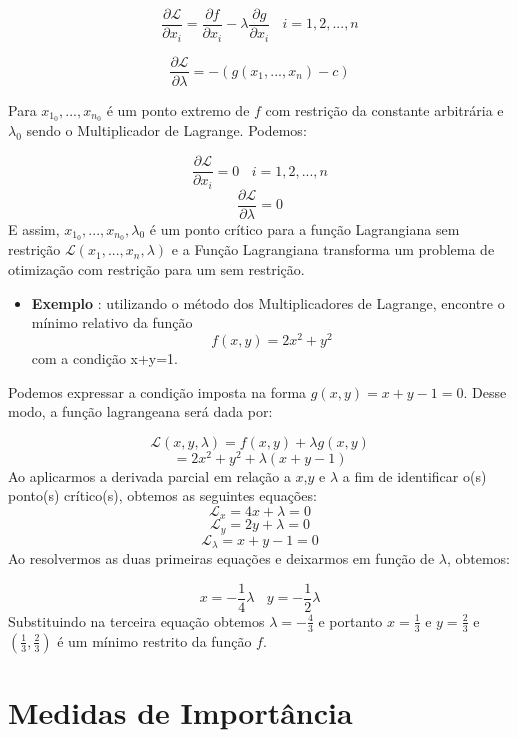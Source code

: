 \documentclass[
  openany]{book}
\providecommand{\tightlist}{%
  \setlength{\itemsep}{0pt}\setlength{\parskip}{0pt}}
\begin{document}
\begin{equation} 
\frac{\partial \mathcal{L}}{\partial x_i}=\frac{\partial f}{\partial x_i}-\lambda \frac{\partial g}{\partial x_i} \ \ \ \ i=1,2,...,n
  \label{eq:lagrangepartialx}
\end{equation}

\begin{equation} 
\frac{\partial \mathcal{L}}{\partial \lambda}=-(g(x_1,...,x_n)-c)
  \label{eq:lagrangepartiallambda}
\end{equation}

Para \(x_{1_0},...,x_{n_0}\) é um ponto extremo de \(f\) com restrição da constante arbitrária e \(\lambda_0\) sendo o Multiplicador de Lagrange. Podemos:

\[\frac{\partial \mathcal{L}}{\partial x_i}=0 \ \ \ \ i=1,2,...,n\]
\[\frac{\partial \mathcal{L}}{\partial \lambda}=0\]
E assim, \(x_{1_0},...,x_{n_0},\lambda_0\) é um ponto crítico para a função Lagrangiana sem restrição \(\mathcal{L}(x_1,...,x_n,\lambda)\) \citep{cardoso2014analise} e a Função Lagrangiana transforma um problema de otimização com restrição para um sem restrição.

\begin{itemize}
\tightlist
\item
  \textbf{Exemplo} \citep{tan2008}: utilizando o método dos Multiplicadores de Lagrange, encontre o mínimo relativo da função
  \[f(x,y)=2x^2+y^2\]
  com a condição x+y=1.
\end{itemize}

Podemos expressar a condição imposta na forma \(g(x,y)=x+y-1=0\). Desse modo, a função lagrangeana será dada por:

\[\mathcal{L}(x,y,\lambda)=f(x,y)+\lambda g(x,y)\]
\[=2x^2+y^2+\lambda(x+y-1)\]
Ao aplicarmos a derivada parcial em relação a \(x\),\(y\) e \(\lambda\) a fim de identificar o(s) ponto(s) crítico(s), obtemos as seguintes equações:
\[\mathcal{L}_x=4x+\lambda=0\]
\[\mathcal{L}_y=2y+\lambda=0\]
\[\mathcal{L}_\lambda=x+y-1=0\]
Ao resolvermos as duas primeiras equações e deixarmos em função de \(\lambda\), obtemos:

\[x=- \frac{1}{4}\lambda \ \ \ \ y=- \frac{1}{2}\lambda\]
Substituindo na terceira equação obtemos \(\lambda=-\frac{4}{3}\) e portanto \(x=\frac{1}{3}\) e \(y=\frac{2}{3}\) e \((\frac{1}{3},\frac{2}{3})\) é um mínimo restrito da função \(f\).

\hypertarget{medidasimport}{%
\section{Medidas de Importância}\label{medidasimport}}
\end{document}

